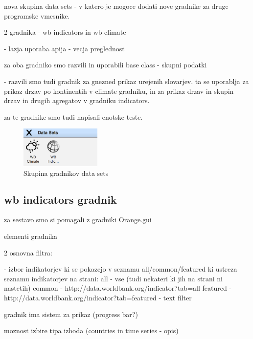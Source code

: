 nova skupina data sets 
 - v katero je mogoce dodati nove gradnike za druge programske vmesnike.

2 gradnika - wb indicators in wb climate

- lazja uporaba apija
- vecja preglednost


za oba gradniko smo razvili in uporabili base class - skupni podatki

- razvili smo tudi gradnik za gnezned prikaz urejenih slovarjev.
  ta se uporablja za prikaz drzav po kontinentih v climate gradniku,
  in za prikaz drzav in skupin drzav in drugih agregatov v gradniku
  indicators.


za te gradnike smo tudi napisali enotske teste.


\begin{figure}
  \begin{center}
    \includegraphics[width=4cm]{pic/data_sets_group.png}
  \end{center}
  \caption{Skupina gradnikov data sets}
  \label{data_sets_group}
\end{figure} 


\subsection{wb indicators gradnik}

za sestavo smo si pomagali z gradniki Orange.gui 

elementi gradnika

2 osnovna filtra: 

- izbor indikatorjev ki se pokazejo v seznamu all/common/featured 
  ki ustreza seznamu indikatorjev na strani: 
  all - vse (tudi nekateri ki jih na strani ni nastetih)
  common - http://data.worldbank.org/indicator?tab=all
  featured - http://data.worldbank.org/indicator?tab=featured
- text filter

gradnik ima sistem za prikaz (progress bar?) 

moznost izbire tipa izhoda (countries in time series - opis)

